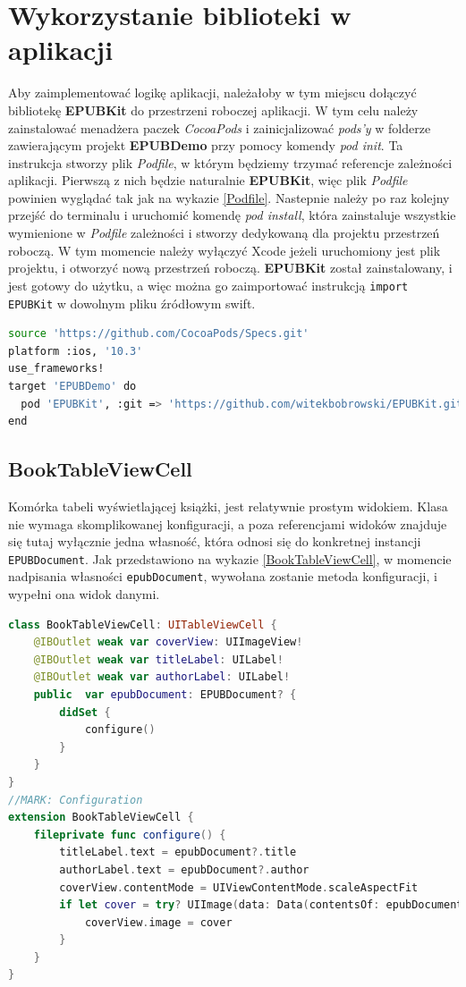 \section{Wykorzystanie biblioteki w aplikacji}

Aby zaimplementować logikę aplikacji, należałoby w tym miejscu dołączyć bibliotekę \textbf{EPUBKit} do przestrzeni roboczej aplikacji. W tym celu należy zainstalować menadżera paczek \textit{CocoaPods} i zainicjalizować \textit{pods’y} w folderze zawierającym projekt \textbf{EPUBDemo} przy pomocy komendy \textit{pod init}. Ta instrukcja stworzy plik \textit{Podfile}, w którym będziemy trzymać referencje zależności aplikacji. Pierwszą z nich będzie naturalnie \textbf{EPUBKit}, więc plik \textit{Podfile} powinien wyglądać tak jak na wykazie \ref{Podfile}. Nastepnie należy po raz kolejny przejść do terminalu i uruchomić komendę \textit{pod install}, która zainstaluje wszystkie wymienione w \textit{Podfile} zależności i stworzy dedykowaną dla projektu przestrzeń roboczą. W tym momencie należy wyłączyć Xcode jeżeli uruchomiony jest plik projektu, i otworzyć nową przestrzeń roboczą. \textbf{EPUBKit} został zainstalowany, i jest gotowy do użytku, a więc można go zaimportować instrukcją \texttt{import EPUBKit} w dowolnym pliku źródłowym swift.

\begin{lstlisting}[caption={Struktura modelu EPUBKit}, language=bash,label=Podfile]
source 'https://github.com/CocoaPods/Specs.git'
platform :ios, '10.3'
use_frameworks!
target 'EPUBDemo' do
  pod 'EPUBKit', :git => 'https://github.com/witekbobrowski/EPUBKit.git'
end
\end{lstlisting}

\subsection{BookTableViewCell}

Komórka tabeli wyświetlającej książki, jest relatywnie prostym widokiem. Klasa nie wymaga skomplikowanej konfiguracji, a poza referencjami widoków znajduje się tutaj wyłącznie jedna własność, która odnosi się do konkretnej instancji \texttt{EPUBDocument}. Jak przedstawiono na wykazie \ref{BookTableViewCell}, w momencie nadpisania własności \texttt{epubDocument}, wywołana zostanie metoda konfiguracji, i wypełni ona widok danymi.

\begin{lstlisting}[caption={Deklaracja klasy \texttt{UITableViewCell}}, language=swift, label=BookTableViewCell]
class BookTableViewCell: UITableViewCell {
    @IBOutlet weak var coverView: UIImageView!
    @IBOutlet weak var titleLabel: UILabel!
    @IBOutlet weak var authorLabel: UILabel!
    public  var epubDocument: EPUBDocument? {
        didSet {
            configure()
        }
    }
}
//MARK: Configuration
extension BookTableViewCell {
    fileprivate func configure() {
        titleLabel.text = epubDocument?.title
        authorLabel.text = epubDocument?.author
        coverView.contentMode = UIViewContentMode.scaleAspectFit
        if let cover = try? UIImage(data: Data(contentsOf: epubDocument?.cover ?? URL(fileURLWithPath: "") )) {
            coverView.image = cover
        }
    }
}
\end{lstlisting}

